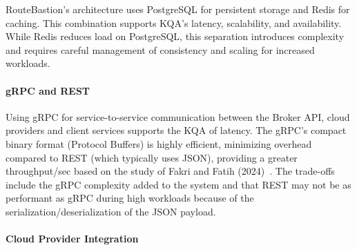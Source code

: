 
RouteBastion's architecture uses PostgreSQL for persistent storage and Redis for caching. This combination supports KQA's latency, scalability, and availability. While Redis reduces load on PostgreSQL, this separation introduces complexity and requires careful management of consistency and scaling for increased workloads.

\paragraph{gRPC and REST}
Using gRPC \cite{grpc} for service-to-service communication between the Broker API, cloud providers and client services supports the KQA of latency. The gRPC's compact binary format (Protocol Buffers) is highly efficient, minimizing overhead compared to REST (which typically uses JSON), providing a greater throughput/sec based on the study of Fakri and Fatih (2024)~\cite{apiGateways}. The trade-offs include the gRPC complexity added to the system and that REST may not be as performant as gRPC during high workloads because of the serialization/deserialization of the JSON payload.

\paragraph{Cloud Provider Integration}

